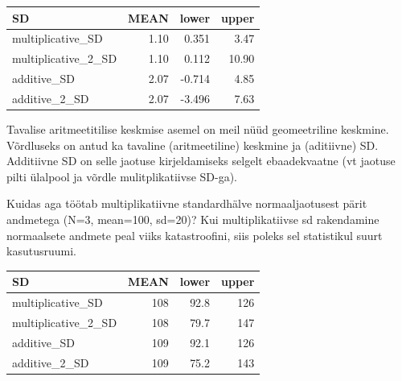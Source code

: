 \documentclass[]{book}
\newenvironment{Shaded}{\begin{snugshade}}{\end{snugshade}}
\newcommand{\CommentTok}[1]{\textcolor[rgb]{0.56,0.35,0.01}{\textit{#1}}}
\newcommand{\DataTypeTok}[1]{\textcolor[rgb]{0.13,0.29,0.53}{#1}}
\newcommand{\DecValTok}[1]{\textcolor[rgb]{0.00,0.00,0.81}{#1}}
\newcommand{\KeywordTok}[1]{\textcolor[rgb]{0.13,0.29,0.53}{\textbf{#1}}}
\newcommand{\NormalTok}[1]{#1}
\newcommand{\OperatorTok}[1]{\textcolor[rgb]{0.81,0.36,0.00}{\textbf{#1}}}
\newcommand{\StringTok}[1]{\textcolor[rgb]{0.31,0.60,0.02}{#1}}
\begin{document}
\begin{Shaded}
\end{Shaded}

\begin{tabular}{l|r|r|r}
\hline
SD & MEAN & lower & upper\\
\hline
multiplicative\_SD & 1.10 & 0.351 & 3.47\\
\hline
multiplicative\_2\_SD & 1.10 & 0.112 & 10.90\\
\hline
additive\_SD & 2.07 & -0.714 & 4.85\\
\hline
additive\_2\_SD & 2.07 & -3.496 & 7.63\\
\hline
\end{tabular}

Tavalise aritmeetitilise keskmise asemel on meil nüüd geomeetriline keskmine. Võrdluseks on antud ka tavaline (aritmeetiline) keskmine ja (aditiivne) SD. Additiivne SD on selle jaotuse kirjeldamiseks selgelt ebaadekvaatne (vt jaotuse pilti ülalpool ja võrdle mulitplikatiivse SD-ga).

Kuidas aga töötab multiplikatiivne standardhälve normaaljaotusest pärit andmetega (N=3, mean=100, sd=20)? Kui multiplikatiivse sd rakendamine normaalsete andmete peal viiks katastroofini, siis poleks sel statistikul suurt kasutusruumi.

\begin{tabular}{l|r|r|r}
\hline
SD & MEAN & lower & upper\\
\hline
multiplicative\_SD & 108 & 92.8 & 126\\
\hline
multiplicative\_2\_SD & 108 & 79.7 & 147\\
\hline
additive\_SD & 109 & 92.1 & 126\\
\hline
additive\_2\_SD & 109 & 75.2 & 143\\
\hline
\end{tabular}
\end{document}
